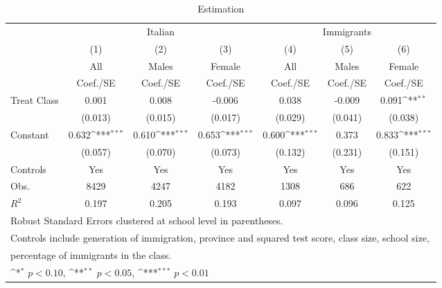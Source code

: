 \begin{table}[htbp]\centering
\def\sym#1{\ifmmode^{#1}\else\(^{#1}\)\fi}
\caption{Estimation \label{peer\_lictec2}}
\begin{tabular}{l*{6}{c}}
\toprule
                    &\multicolumn{3}{c}{Italian}                                      &\multicolumn{3}{c}{Immigrants}                                   \\\cmidrule(lr){2-4}\cmidrule(lr){5-7}
                    &\multicolumn{1}{c}{(1)}&\multicolumn{1}{c}{(2)}&\multicolumn{1}{c}{(3)}&\multicolumn{1}{c}{(4)}&\multicolumn{1}{c}{(5)}&\multicolumn{1}{c}{(6)}\\
                    &\multicolumn{1}{c}{All}&\multicolumn{1}{c}{Males}&\multicolumn{1}{c}{Female}&\multicolumn{1}{c}{All}&\multicolumn{1}{c}{Males}&\multicolumn{1}{c}{Female}\\
                    &    Coef./SE         &    Coef./SE         &    Coef./SE         &    Coef./SE         &    Coef./SE         &    Coef./SE         \\
\midrule
Treat Class         &       0.001         &       0.008         &      -0.006         &       0.038         &      -0.009         &       0.091\sym{**} \\
                    &     (0.013)         &     (0.015)         &     (0.017)         &     (0.029)         &     (0.041)         &     (0.038)         \\
Constant            &       0.632\sym{***}&       0.610\sym{***}&       0.653\sym{***}&       0.600\sym{***}&       0.373         &       0.833\sym{***}\\
                    &     (0.057)         &     (0.070)         &     (0.073)         &     (0.132)         &     (0.231)         &     (0.151)         \\
Controls            &         Yes         &         Yes         &         Yes         &         Yes         &         Yes         &         Yes         \\
\midrule
Obs.                &        8429         &        4247         &        4182         &        1308         &         686         &         622         \\
\(R^{2}\)           &       0.197         &       0.205         &       0.193         &       0.097         &       0.096         &       0.125         \\
\bottomrule
\multicolumn{7}{l}{\footnotesize Robust Standard Errors clustered at school level in parentheses.}\\
\multicolumn{7}{l}{\footnotesize Controls include generation of immigration, province and squared test score, class size, school size,}\\
\multicolumn{7}{l}{\footnotesize percentage of immigrants in the class.}\\
\multicolumn{7}{l}{\footnotesize \sym{*} \(p<0.10\), \sym{**} \(p<0.05\), \sym{***} \(p<0.01\)}\\
\end{tabular}
\end{table}

